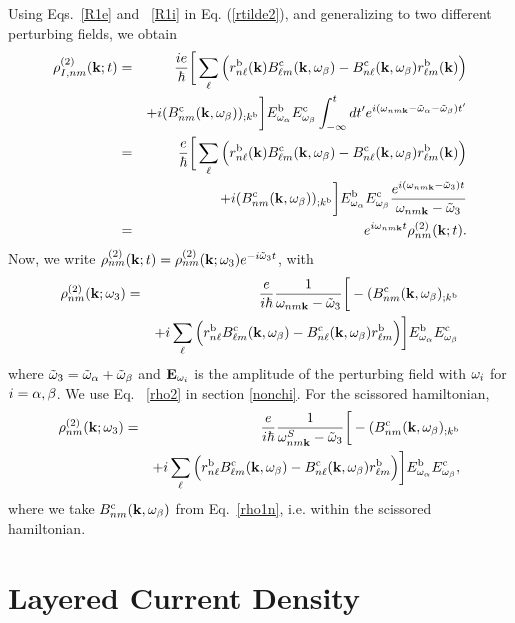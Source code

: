 \documentclass[floatfix,prb,aps,superscriptaddress,11pt,preprint]{revtex4}
\begin{document}
Using Eqs.~\eqref{R1e} and ~\eqref{R1i} in Eq. (\ref{rtilde2}),
and generalizing to two different perturbing fields,
we obtain
\begin{eqnarray}\label{rtilde33}
{\rho}^{(2)}_{I,nm}(\mathbf{k};t)
&=&
\frac{ie}{\hbar}
\bigg[
\sum_{\ell}
\Big(
r^{\mathrm{b}}_{n\ell}(\mathbf{k})
B^{\mathrm{c}}_{\ell m}(\mathbf{k},\omega_\beta)
-
B^{\mathrm{c}}_{n\ell}(\mathbf{k},\omega_\beta)
r^{\mathrm{b}}_{\ell m}(\mathbf{k})
\Big)
\nonumber \\
&&+
i
(B^{\mathrm{c}}_{nm}(\mathbf{k},\omega_\beta))_{;k^{\mathrm{b}}}
\bigg]
E^{\mathrm{b}}_{\omega_\alpha}E_{\omega_\beta}^{\mathrm{c}}
\int_{-\infty}^t dt'
e^{i(\omega_{nm\mathbf{k}}-\tilde\omega_\alpha-\tilde\omega_\beta)t'}
\nonumber \\
&=&
\frac{e}{\hbar}
\bigg[
\sum_{\ell}
\Big(
r^{\mathrm{b}}_{n\ell}(\mathbf{k})
B^{\mathrm{c}}_{\ell m}(\mathbf{k},\omega_\beta)
-
B^{\mathrm{c}}_{n\ell}(\mathbf{k},\omega_\beta)
r^{\mathrm{b}}_{\ell m}(\mathbf{k})
\Big)
\nonumber \\
&&+
i
(B^{\mathrm{c}}_{nm}(\mathbf{k},\omega_\beta))_{;k^{\mathrm{b}}}
\bigg]
E^{\mathrm{b}}_{\omega_\alpha}E_{\omega_\beta}^{\mathrm{c}}
\frac{e^{i(\omega_{nm\mathbf{k}}-\tilde\omega_3)t}}
{\omega_{nm\mathbf{k}}-\tilde\omega_3}
\nonumber \\
&=&
e^{i\omega_{nm\mathbf{k}}t}
\rho_{nm}^{(2)}(\mathbf{k};t)
.
\end{eqnarray}
Now, we write
$\rho_{nm}^{(2)}(\mathbf{k};t)=\rho_{nm}^{(2)}(\mathbf{k};\omega_3)e^{-i\tilde\omega_3 t}$,
with
\begin{eqnarray}\label{rho2}
{\rho}_{nm}^{(2)}(\mathbf{k};\omega_3)&=&\frac{e}{i\hbar}\frac{1}{\omega_{nm\mathbf{k}}-\tilde\omega_3}
\bigg[-(B_{nm}^{\mathrm{c}}(\mathbf{k},\omega_\beta)_{;k^{\mathrm{b}}}
\nonumber \\
&&
+i\sum_\ell\Big(r_{n\ell}^{\mathrm{b}}B_{\ell m}^{\mathrm{c}}(\mathbf{k},\omega_\beta) - B_{n\ell}^{\mathrm{c}}(\mathbf{k},\omega_\beta)
  r_{\ell m}^{\mathrm{b}}\Big)
\bigg] 
E^{\mathrm{b}}_{\omega_\alpha}E_{\omega_\beta}^{\mathrm{c}}
\end{eqnarray} 
where $\tilde\omega_3=\tilde\omega_\alpha+\tilde\omega_\beta$ and $\mathbf{E}_{\omega_i}$ is the amplitude of the perturbing
field with $\omega_i$ for $i=\alpha,\beta$. We use Eq.
~\eqref{rho2} in section \ref{nonchi}. For the scissored hamiltonian,
\begin{eqnarray}\label{rho2n}
{\rho}_{nm}^{(2)}(\mathbf{k};\omega_3)&=&\frac{e}{i\hbar}\frac{1}{\omega^S_{nm\mathbf{k}}-\tilde\omega_3}
\bigg[-(B_{nm}^{\mathrm{c}}(\mathbf{k},\omega_\beta)_{;k^{\mathrm{b}}}
\nonumber \\
&&
+i\sum_\ell\Big(r_{n\ell}^{\mathrm{b}}B_{\ell m}^{\mathrm{c}}(\mathbf{k},\omega_\beta) - B_{n\ell}^{\mathrm{c}}(\mathbf{k},\omega_\beta)
  r_{\ell m}^{\mathrm{b}}\Big)
\bigg]
E^{\mathrm{b}}_{\omega_\alpha}E_{\omega_\beta}^{\mathrm{c}}
,
\end{eqnarray}
where we take $B_{nm}^{\mathrm{c}}(\mathbf{k},\omega_\beta)$ 
from Eq.~\eqref{rho1n}, i.e. within the scissored
hamiltonian. 


\section{Layered Current Density}\label{cd}
\end{document}
